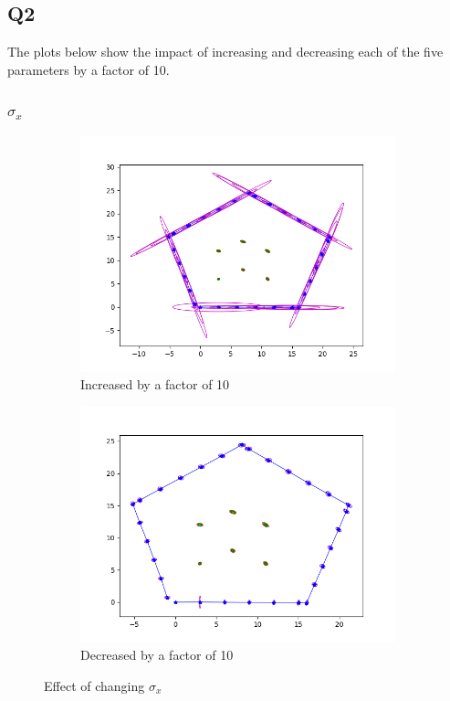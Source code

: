 \documentclass[12pt, a4paper]{article}
\begin{document}
\subsection{Q2}
The plots below show the impact of increasing and decreasing each of the five parameters by a factor of 10.
\subsubsection{$\sigma_x$}

\begin{figure}[H]
  \centering
  \begin{subfigure}[b]{0.45\linewidth}
    \includegraphics[width=\linewidth]{./results/q3_2/result_x.png}
    \caption{Increased by a factor of 10}
  \end{subfigure}
  \hspace{0.5cm}
  \begin{subfigure}[b]{0.45\linewidth}
    \includegraphics[width=\linewidth]{./results/q3_2/result_x_dec.png}
    \caption{Decreased by a factor of 10}
  \end{subfigure}
  \caption{Effect of changing $\sigma_x$}
\end{figure}
\end{document}
